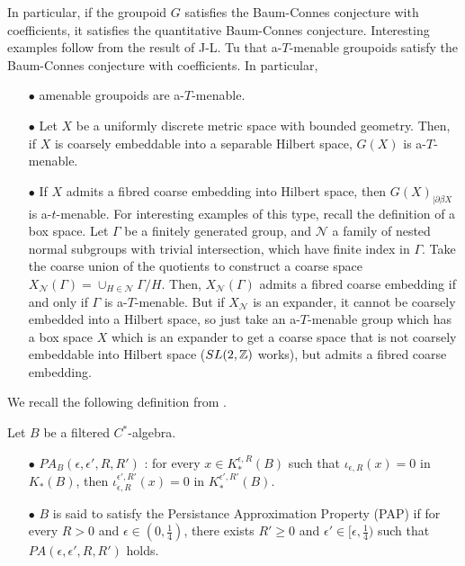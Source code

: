 In particular, if the groupoid $G$ satisfies the Baum-Connes conjecture with coefficients, it satisfies the quantitative Baum-Connes conjecture. Interesting examples follow from the result of J-L. Tu \cite{TuThese} that a-$T$-menable groupoids satisfy the Baum-Connes conjecture with coefficients. In particular, \\

\begin{itemize}
\item[$\bullet$] amenable groupoids are a-$T$-menable.\\
\item[$\bullet$] Let $X$ be a uniformly discrete metric space with bounded geometry. Then, if $X$ is coarsely embeddable into a separable Hilbert space, $G(X)$ is a-$T$-menable.\cite{SkTuYu} \\
\item[$\bullet$] If $X$ admits a fibred coarse embedding into Hilbert space, then $G(X)_{|\partial \beta X}$ is a-$t$-menable.\cite{FinnSellFibred} For interesting examples of this type, recall the definition of a box space. Let $\Gamma$ be a finitely generated group, and $\mathcal N$ a family of nested normal subgroups with trivial intersection, which have finite index in $\Gamma$. Take the coarse union of the quotients to construct a coarse space $X_{\mathcal N}(\Gamma)= \cup_{H\in \mathcal N } \Gamma/ H$. Then, $X_{\mathcal N}(\Gamma)$ admits a fibred coarse embedding if and only if $\Gamma$ is a-$T$-menable. But if $X_{\mathcal N}$ is an expander, it cannot be coarsely embedded into a Hilbert space, so just take an a-$T$-menable group which has a box space $X$ which is an expander to get a coarse space that is not coarsely embeddable into Hilbert space ($SL(2,\mathbb Z)$ works), but admits a fibred coarse embedding.\\
\end{itemize}

We recall the following definition from \cite{OY3}.

\begin{definition}
Let $B$ be a filtered $C^*$-algebra. 
\begin{itemize}
\item[$\bullet$] $PA_B(\epsilon,\epsilon',R,R')$ : for every $x\in K_*^{\epsilon,R}(B)$ such that $\iota_{\epsilon,R}(x)=0$ in $K_*(B)$, then $\iota_{\epsilon,R}^{\epsilon',R'}(x)=0$ in $K_*^{\epsilon',R'}(B)$.
\item[$\bullet$] $B$ is said to satisfy the Persistance Approximation Property (PAP) if for every $R>0$ and $\epsilon\in (0,\frac{1}{4})$, there exists $R'\geq 0 $ and $\epsilon'\in [\epsilon,\frac{1}{4})$ such that $PA(\epsilon,\epsilon',R,R')$ holds.
\end{itemize}
\end{definition}

